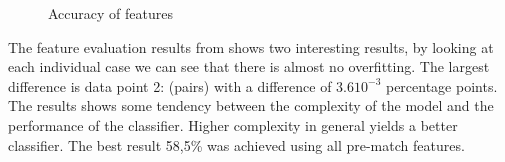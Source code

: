 \begin{figure}[!htb]
  \centering
   \caption{Accuracy of features}\label{fig:cluster-feat}
\end{figure}

The feature evaluation results from  shows two interesting results, by looking at each individual case we can see that there is almost no overfitting. The largest difference is data point 2: (pairs) with a difference of $3.610^{-3}$ percentage points. The results shows some tendency between the complexity of the model and the performance of the classifier. Higher complexity in general yields a better classifier. The best result 58,5\% was achieved using all pre-match features.

